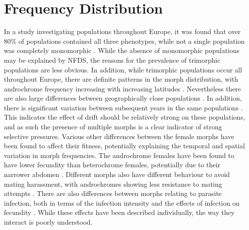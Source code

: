 \documentclass{article}
\begin{document}
\section{Frequency Distribution}
In a study investigating populations throughout Europe, it was found that over 80\% of populations contained all three phenotypes, while not a single population was completely monomorphic \cite{Gosden2011}. While the absence of monomorphic populations may be explained by NFDS, the reasons for the prevalence of trimorphic populations are less obvious. In addition, while trimorphic populations occur all throughout Europe, there are definite patterns in the morph distribution, with androchrome frequency increasing with increasing latitudes \cite{Gosden2011}. Nevertheless there are also large differences between geographically close populations \cite{Gosden2011}. In addition, there is significant variation between subsequent years in the same populations \cite{Svensson2005}. This indicates the effect of drift should be relatively strong on these populations, and as such the presence of multiple morphs is a clear indicator of strong selective pressures.
Various other differences between the female morphs have been found to affect their fitness, potentially explaining the temporal and spatial variation in morph frequencies. The androchrome females have been found to have lower fecundity than heterochrome females, potentially due to their narrower abdomen \cite{Gosden2009}. Different morphs also have different behaviour to avoid mating harassment, with androchromes showing less resistance to mating attempts \cite{Gosden2009}. There are also differences between morphs relating to parasite infection, both in terms of the infection intensity and the effects of infection on fecundity \cite{Willink2017}.
While these effects have been described individually, the way they interact is poorly understood.

\printbibliography
\end{document}
